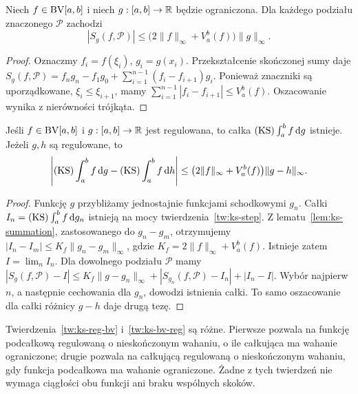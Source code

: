 \begin{lemat}
\label{lem:ks-summation}
Niech $f\in\mathrm{BV}[a,b]$ i niech $g:[a,b]\to\mathbb R$ będzie ograniczona. Dla każdego podziału znaczonego $\mathcal P$ zachodzi
\[
 |S_g(f,\mathcal P)|\le
 \bigl(2\|f\|_\infty+V_a^b(f)\bigr)\|g\|_\infty.
\]
\end{lemat}
\begin{proof}
Oznaczmy $f_i=f(\xi_i)$, $g_i=g(x_i)$. Przekształcenie skończonej sumy daje
$S_g(f,\mathcal P)=f_ng_n-f_1g_0+\sum_{i=1}^{n-1}(f_i-f_{i+1})g_i$. Ponieważ znaczniki są uporządkowane, $\xi_i\le\xi_{i+1}$, mamy $\sum_{i=1}^{n-1}|f_i-f_{i+1}|\le V_a^b(f)$. Oszacowanie wynika z nierówności trójkąta.
\end{proof}

\begin{twierdzenie}
\label{tw:ks-bv-reg}
Jeśli $f\in\mathrm{BV}[a,b]$ i $g:[a,b]\to\mathbb R$ jest regulowana, to całka $(\mathrm{KS})\int_a^b f\,\mathrm dg$ istnieje. Jeżeli $g,h$ są regulowane, to
\[
 \left|(\mathrm{KS})\int_a^b f\,\mathrm dg-(\mathrm{KS})\int_a^b f\,\mathrm dh\right|
 \le\bigl(2\|f\|_\infty+V_a^b(f)\bigr)\|g-h\|_\infty.
\]
\end{twierdzenie}
\begin{proof}
Funkcję $g$ przybliżamy jednostajnie funkcjami schodkowymi $g_n$. Całki $I_n=(\mathrm{KS})\int_a^b f\,\mathrm dg_n$ istnieją na mocy twierdzenia~\ref{tw:ks-step}. Z lematu~\ref{lem:ks-summation}, zastosowanego do $g_n-g_m$, otrzymujemy $|I_n-I_m|\le K_f\|g_n-g_m\|_\infty$, gdzie $K_f=2\|f\|_\infty+V_a^b(f)$. Istnieje zatem $I=\lim_nI_n$. Dla dowolnego podziału $\mathcal P$ mamy
$|S_g(f,\mathcal P)-I|\le K_f\|g-g_n\|_\infty+|S_{g_n}(f,\mathcal P)-I_n|+|I_n-I|$. Wybór najpierw $n$, a następnie cechowania dla $g_n$, dowodzi istnienia całki. To samo oszacowanie dla całki różnicy $g-h$ daje drugą tezę.
\end{proof}

\begin{uwaga}
Twierdzenia~\ref{tw:ks-reg-bv} i~\ref{tw:ks-bv-reg} są różne. Pierwsze pozwala na funkcję podcałkową regulowaną o nieskończonym wahaniu, o ile całkująca ma wahanie ograniczone; drugie pozwala na całkującą regulowaną o nieskończonym wahaniu, gdy funkcja podcałkowa ma wahanie ograniczone. Żadne z tych twierdzeń nie wymaga ciągłości obu funkcji ani braku wspólnych skoków.
\end{uwaga}

